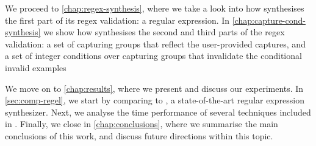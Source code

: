 We proceed to \autoref{chap:regex-synthesis}, where we take a look into how \Forest synthesises the first part of its regex validation: a regular expression.
%
In \autoref{chap:capture-cond-synthesis} we show how \Forest synthesises the second and third parts of the regex validation: a set of capturing groups that reflect the user-provided captures, and a set of integer conditions over capturing groups that invalidate the conditional invalid examples

We move on to \autoref{chap:results}, where we present and discuss our experiments. In \autoref{sec:comp-regel}, we start by comparing \Forest to \Regel, a state-of-the-art regular expression synthesizer. Next, we analyse the time performance of several techniques included in \Forest.
%
Finally, we close in \autoref{chap:conclusions}, where we summarise the main conclusions of this work, and discuss future directions within this topic.

